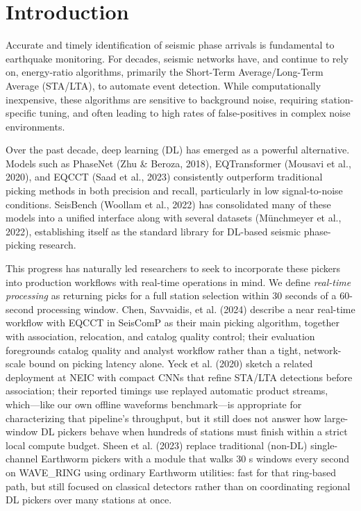 \section{Introduction}

Accurate and timely identification of seismic phase arrivals is fundamental to earthquake monitoring. For decades, seismic networks have, and continue to rely on, energy-ratio algorithms, primarily the Short-Term Average/Long-Term Average (STA/LTA), to automate event detection. While computationally inexpensive, these algorithms are sensitive to background noise, requiring station-specific tuning, and often leading to high rates of false-positives in complex noise environments.

Over the past decade, deep learning (DL) has emerged as a powerful alternative. Models such as PhaseNet (Zhu \& Beroza, 2018), EQTransformer (Mousavi et al., 2020), and EQCCT (Saad et al., 2023) consistently outperform traditional picking methods in both precision and recall, particularly in low signal-to-noise conditions. SeisBench (Woollam et al., 2022) has consolidated many of these models into a unified interface along with several datasets (Münchmeyer et al., 2022), establishing itself as the standard library for DL-based seismic phase-picking research.

This progress has naturally led researchers to seek to incorporate these pickers into production workflows with real-time operations in mind. We define \emph{real-time processing} as returning picks for a full station selection within 30 seconds of a 60-second processing window. Chen, Savvaidis, et al. (2024) describe a near real-time workflow with EQCCT in SeisComP as their main picking algorithm, together with association, relocation, and catalog quality control; their evaluation foregrounds catalog quality and analyst workflow rather than a tight, network-scale bound on picking latency alone. Yeck et al. (2020) sketch a related deployment at NEIC with compact CNNs that refine STA/LTA detections before association; their reported timings use replayed automatic product streams, which—like our own offline waveforms benchmark—is appropriate for characterizing that pipeline’s throughput, but it still does not answer how large-window DL pickers behave when hundreds of stations must finish within a strict local compute budget. Sheen et al. (2023) replace traditional (non-DL) single-channel Earthworm pickers with a module that walks 30 s windows every second on WAVE\_RING using ordinary Earthworm utilities: fast for that ring-based path, but still focused on classical detectors rather than on coordinating regional DL pickers over many stations at once.

